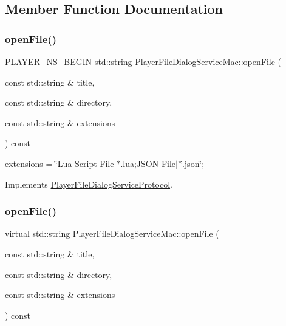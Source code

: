 \subsection{Member Function Documentation}
\mbox{\label{classPlayerFileDialogServiceMac_a8752560c26dc0d249dd33ea47309a289}} 
\subsubsection{\texorpdfstring{open\+File()}{openFile()}\hspace{0.1cm}{\footnotesize\ttfamily [1/2]}}
{\footnotesize\ttfamily P\+L\+A\+Y\+E\+R\+\_\+\+N\+S\+\_\+\+B\+E\+G\+IN std\+::string Player\+File\+Dialog\+Service\+Mac\+::open\+File (\begin{DoxyParamCaption}\item[{const std\+::string \&}]{title,  }\item[{const std\+::string \&}]{directory,  }\item[{const std\+::string \&}]{extensions }\end{DoxyParamCaption}) const\hspace{0.3cm}{\ttfamily [virtual]}}

extensions = \char`\"{}\+Lua Script File$\vert$$\ast$.\+lua;\+J\+S\+O\+N File$\vert$$\ast$.\+json\char`\"{}; 

Implements \hyperlink{classPlayerFileDialogServiceProtocol_ac9ef6f506a2ad68bcec05a0029b5cf83}{Player\+File\+Dialog\+Service\+Protocol}.

\mbox{\label{classPlayerFileDialogServiceMac_a79a6a3ca54cdb15fec5d0a9caeafabde}} 
\subsubsection{\texorpdfstring{open\+File()}{openFile()}\hspace{0.1cm}{\footnotesize\ttfamily [2/2]}}
{\footnotesize\ttfamily virtual std\+::string Player\+File\+Dialog\+Service\+Mac\+::open\+File (\begin{DoxyParamCaption}\item[{const std\+::string \&}]{title,  }\item[{const std\+::string \&}]{directory,  }\item[{const std\+::string \&}]{extensions }\end{DoxyParamCaption}) const\hspace{0.3cm}{\ttfamily [virtual]}}

